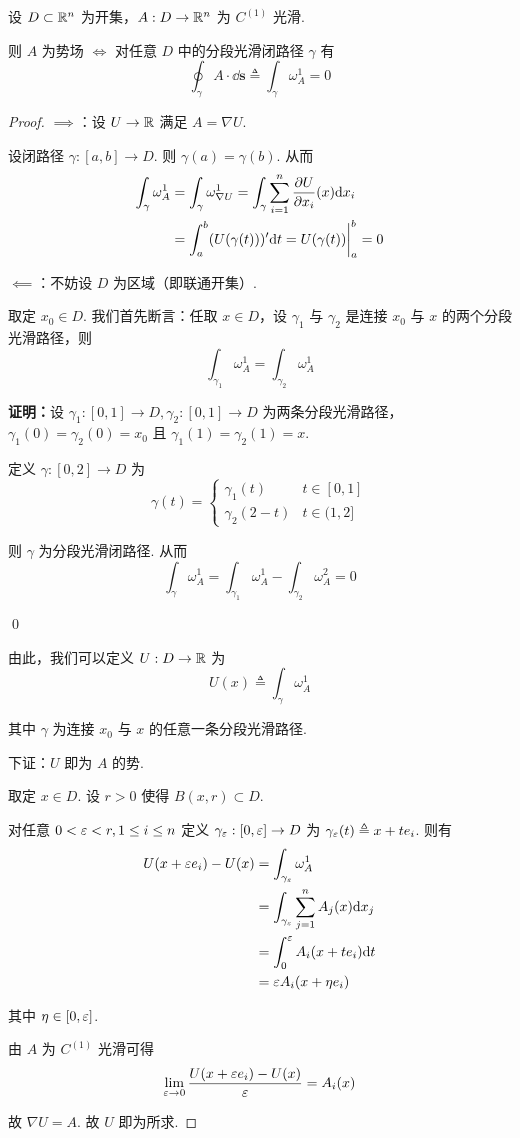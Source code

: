 \begin{property}
    设 $D\subset\mathbb{R}^n$ 为开集，$A:D\to\mathbb{R}^n$ 为 $C^{(1)}$ 光滑.

    则 $A$ 为势场 $\iff$ 对任意 $D$ 中的分段光滑闭路径 $\gamma$ 有
$$
\oint_\gamma A\cdot\dd\mathbf{s}\triangleq\int_\gamma\omega_A^1=0
$$
\end{property}
\begin{proof}
    $\implies$：设 $U\to\mathbb{R}$ 满足 $A=\nabla U$.
    
    设闭路径 $\gamma:[a,b]\to D$. 则 $\gamma(a)=\gamma(b)$. 从而
$$
\begin{aligned}
    \int_\gamma\omega_A^1&=\int_\gamma\omega_{\nabla U}^1=\int_\gamma\sum_{i=1}^n\frac{\partial{U}}{\partial{x_i}}(x)\mathrm{d} x_i\\
    &=\int_a^b(U(\gamma(t)))'\mathrm{d} t=U(\gamma(t))\biggr |_a^b=0
\end{aligned}
$$

    $\impliedby$：不妨设 $D$ 为区域（即联通开集）.

    取定 $x_0\in D$. 我们首先断言：任取 $x\in D$，设 $\gamma_1$ 与 $\gamma_2$ 是连接 $x_0$ 与 $x$ 的两个分段光滑路径，则
$$
\int_{\gamma_1}\omega_A^1=\int_{\gamma_2}\omega_A^1
$$

    \textbf{证明：}设 $\gamma_1:[0,1]\to D,\gamma_2:[0,1]\to D$ 为两条分段光滑路径，$\gamma_1(0)=\gamma_2(0)=x_0$ 且 $\gamma_1(1)=\gamma_2(1)=x$.

    定义 $\gamma:[0,2]\to D$ 为
$$
\gamma(t)=\begin{cases}
    \gamma_1(t) & t\in[0,1]\\
    \gamma_2(2-t) & t\in(1,2]
\end{cases}
$$


    则 $\gamma$ 为分段光滑闭路径. 从而
$$
\int_\gamma\omega_A^1=\int_{\gamma_1}\omega_A^1-\int_{\gamma_2}\omega_A^2=0
$$

    \qed

    由此，我们可以定义 $U:D\to\mathbb{R}$ 为
$$
U(x)\triangleq\int_\gamma\omega_A^1
$$

    其中 $\gamma$ 为连接 $x_0$ 与 $x$ 的任意一条分段光滑路径.

    下证：$U$ 即为 $A$ 的势.

    取定 $x\in D$. 设 $r>0$ 使得 $B(x,r)\subset D$.

    对任意 $0<\varepsilon<r,1\le i\le n$ 定义 $\gamma_\varepsilon:[0,\varepsilon]\to D$ 为 $\gamma_\varepsilon(t)\triangleq x+te_i$. 则有
$$
\begin{aligned}
    U(x+\varepsilon e_i)-U(x)&=\int_{\gamma_\varepsilon}\omega_A^1\\
    &=\int_{\gamma_\varepsilon}\sum_{j=1}^nA_j(x)\mathrm{d} x_j\\
    &=\int_0^\varepsilon A_i(x+te_i)\mathrm{d} t\\
    &=\varepsilon A_i(x+\eta e_i)
\end{aligned}
$$

    其中 $\eta\in[0,\varepsilon]$.


    由 $A$ 为 $C^{(1)}$ 光滑可得
$$
\lim_{\varepsilon\to 0}\frac{U(x+\varepsilon e_i)-U(x)}{\varepsilon}=A_i(x)
$$

    故 $\nabla U=A$. 故 $U$ 即为所求.
\end{proof}

